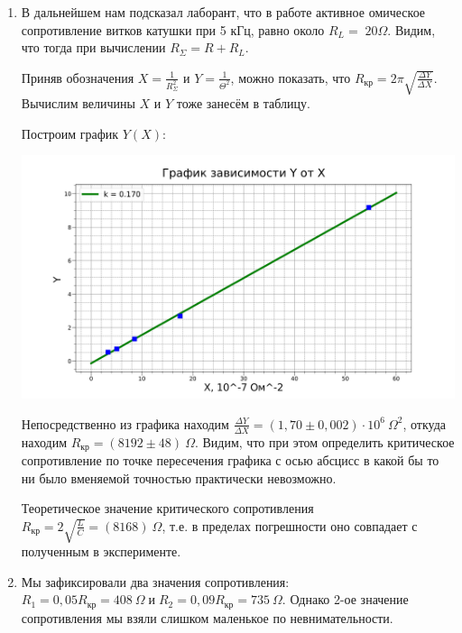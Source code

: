 \documentclass[a4paper,12pt]{article}
\begin{document}
\begin{enumerate}
\item В дальнейшем нам подсказал лаборант, что в работе активное омическое сопротивление витков катушки при 5 кГц, равно около $R_L= \; 20\Omega$. Видим, что тогда при вычислении $R_{\Sigma}=R+R_L$.

Приняв обозначения $X=\frac{1}{R_{\Sigma}^2}$ и $Y=\frac{1}{\Theta^2}$, можно показать, что $R_{\text{кр}}=2\pi\sqrt{\frac{\Delta Y}{\Delta X}}$. Вычислим величины $X$ и $Y$ тоже занесём в таблицу.

Построим график $Y(X)$: 

 \includegraphics[width=0.6\linewidth]{Graph.jpg}
 
 Непосредственно из графика находим $\frac{\Delta Y}{\Delta X}=\left(1,70\pm0,002\right)\cdot10^6~\Omega^2$, откуда находим $R_{\text{кр}}=\left(8192\pm48\right)~\Omega$. Видим, что при этом определить критическое сопротивление по точке пересечения графика с осью абсцисс в какой бы то ни было вменяемой точностью практически невозможно.

Теоретическое значение критического сопротивления $R_{\text{кр}}=2\sqrt{\frac{L}{C}}=\left(8168\right)~\Omega$, т.е. в пределах погрешности оно совпадает с полученным в эксперименте.

\item Мы зафиксировали два значения сопротивления: $R_1=0,05R_{\text{кр}}=408~\Omega \; и \; R_2=0,09R_{\text{кр}}=735~\Omega.$ Однако 2-ое значение сопротивления мы взяли слишком маленькое по невнимательности. 
\end{enumerate}
\end{document}

